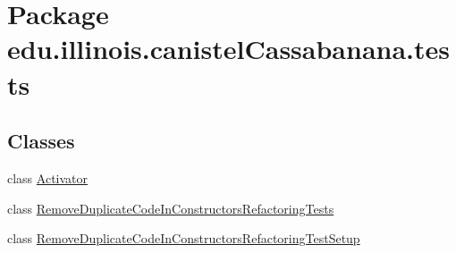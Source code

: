 \hypertarget{namespaceedu_1_1illinois_1_1canistelCassabanana_1_1tests}{
\section{Package edu.illinois.canistelCassabanana.tests}
\label{namespaceedu_1_1illinois_1_1canistelCassabanana_1_1tests}
}
\subsection*{Classes}
\begin{DoxyCompactItemize}
\item 
class \hyperlink{classedu_1_1illinois_1_1canistelCassabanana_1_1tests_1_1Activator}{Activator}
\item 
class \hyperlink{classedu_1_1illinois_1_1canistelCassabanana_1_1tests_1_1RemoveDuplicateCodeInConstructorsRefactoringTests}{RemoveDuplicateCodeInConstructorsRefactoringTests}
\item 
class \hyperlink{classedu_1_1illinois_1_1canistelCassabanana_1_1tests_1_1RemoveDuplicateCodeInConstructorsRefactoringTestSetup}{RemoveDuplicateCodeInConstructorsRefactoringTestSetup}
\end{DoxyCompactItemize}
